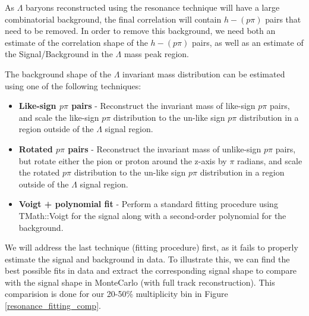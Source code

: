 \documentclass[ALICE,manyauthors]{ALICE_analysis_notes}
\begin{document}
As $\Lambda$ baryons reconstructed using the resonance technique will have a large combinatorial background, the final correlation will contain $h-(p\pi)$ pairs that need to be removed. In order to remove this background, we need both an estimate of the correlation shape of the $h-(p\pi)$ pairs, as well as an estimate of the Signal/Background in the $\Lambda$ mass peak region.

 The background shape of the $\Lambda$ invariant mass distribution can be estimated using one of the following techniques:

 \begin{itemize}
	\item \textbf{Like-sign $p\pi$ pairs} - Reconstruct the invariant mass of like-sign $p\pi$ pairs, and scale the like-sign $p\pi$ distribution to the un-like sign $p\pi$ distribution in a region outside of the $\Lambda$ signal region.
	\item \textbf{Rotated $p\pi$ pairs} - Reconstruct the invariant mass of unlike-sign $p\pi$ pairs, but rotate either the pion or proton around the z-axis by $\pi$ radians, and scale the rotated $p\pi$ distribution to the un-like sign $p\pi$ distribution in a region outside of the $\Lambda$ signal region.
	\item \textbf{Voigt + polynomial fit} - Perform a standard fitting procedure using TMath::Voigt for the signal along with a second-order polynomial for the background.
 \end{itemize}

We will address the last technique (fitting procedure) first, as it fails to properly estimate the signal and background in data. To illustrate this, we can find the best possible fits in data and extract the corresponding signal shape to compare with the signal shape in MonteCarlo (with full track reconstruction). This comparision is done for our 20-50\% multiplicity bin in Figure \ref{resonance_fitting_comp}.
\end{document}
